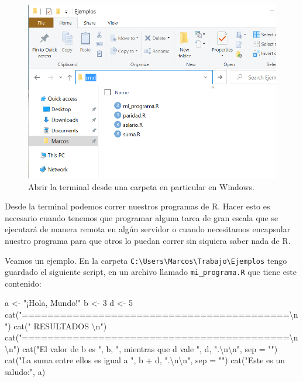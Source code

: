\documentclass[
]{book}
\newenvironment{Shaded}{\begin{snugshade}}{\end{snugshade}}
\newcommand{\AttributeTok}[1]{\textcolor[rgb]{0.77,0.63,0.00}{#1}}
\newcommand{\DecValTok}[1]{\textcolor[rgb]{0.00,0.00,0.81}{#1}}
\newcommand{\FunctionTok}[1]{\textcolor[rgb]{0.00,0.00,0.00}{#1}}
\newcommand{\NormalTok}[1]{#1}
\newcommand{\OtherTok}[1]{\textcolor[rgb]{0.56,0.35,0.01}{#1}}
\newcommand{\SpecialCharTok}[1]{\textcolor[rgb]{0.00,0.00,0.00}{#1}}
\newcommand{\StringTok}[1]{\textcolor[rgb]{0.31,0.60,0.02}{#1}}
\begin{document}
\begin{figure}

{\centering \includegraphics[width=0.8\linewidth]{images/07_otros/terminal6} 

}

\caption{Abrir la terminal desde una carpeta en particular en Windows.}\label{fig:unnamed-chunk-174}
\end{figure}

Desde la terminal podemos correr nuestros programas de R. Hacer esto es necesario cuando tenemos que programar alguna tarea de gran escala que se ejecutará de manera remota en algún servidor o cuando necesitamos encapsular nuestro programa para que otros lo puedan correr sin siquiera saber nada de R.

Veamos un ejemplo. En la carpeta \texttt{C:\textbackslash{}Users\textbackslash{}Marcos\textbackslash{}Trabajo\textbackslash{}Ejemplos} tengo guardado el siguiente script, en un archivo llamado \texttt{mi\_programa.R} que tiene este contenido:

\begin{Shaded}
\begin{Highlighting}[]
\NormalTok{a }\OtherTok{\textless{}{-}} \StringTok{"¡Hola, Mundo!"}
\NormalTok{b }\OtherTok{\textless{}{-}} \DecValTok{3}
\NormalTok{d }\OtherTok{\textless{}{-}} \DecValTok{5}
\FunctionTok{cat}\NormalTok{(}\StringTok{"==========================================}\SpecialCharTok{\textbackslash{}n}\StringTok{"}\NormalTok{)}
\FunctionTok{cat}\NormalTok{(}\StringTok{"                 RESULTADOS               }\SpecialCharTok{\textbackslash{}n}\StringTok{"}\NormalTok{)}
\FunctionTok{cat}\NormalTok{(}\StringTok{"==========================================}\SpecialCharTok{\textbackslash{}n\textbackslash{}n}\StringTok{"}\NormalTok{)}
\FunctionTok{cat}\NormalTok{(}\StringTok{"El valor de b es "}\NormalTok{, b, }\StringTok{", mientras que d vale "}\NormalTok{, d, }\StringTok{".}\SpecialCharTok{\textbackslash{}n\textbackslash{}n}\StringTok{"}\NormalTok{, }\AttributeTok{sep =} \StringTok{""}\NormalTok{)}
\FunctionTok{cat}\NormalTok{(}\StringTok{"La suma entre ellos es igual a "}\NormalTok{, b }\SpecialCharTok{+}\NormalTok{ d, }\StringTok{".}\SpecialCharTok{\textbackslash{}n\textbackslash{}n}\StringTok{"}\NormalTok{, }\AttributeTok{sep =} \StringTok{""}\NormalTok{)}
\FunctionTok{cat}\NormalTok{(}\StringTok{"Este es un saludo:"}\NormalTok{, a)}
\end{Highlighting}
\end{Shaded}
\end{document}
